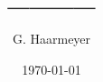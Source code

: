 \documentclass{book}
\begin{document}
\title{____}
\author{G. Haarmeyer}
\date{\today}
\maketitle

\tableofcontents
\newpage



\end{document}
